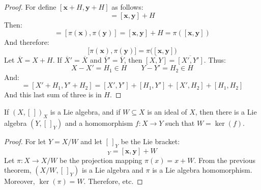 \documentclass[crop=false,class=article]{standalone}                           %
\begin{document}
        \begin{proof}
            For define $[\mathbf{x}+H,\mathbf{y}+H]$ as follows:
            \begin{equation}
                [\mathbf{x}+H,\mathbf{y}+H]=[\mathbf{x},\mathbf{y}]+H
            \end{equation}
            Then:
            \begin{equation}
                [\mathbf{x}+H,\mathbf{y}+H]
                =[\pi(\mathbf{x}),\pi(\mathbf{y})]
                =[\mathbf{x},\mathbf{y}]+H
                =\pi([\mathbf{x},\mathbf{y}])
            \end{equation}
            And therefore:
            \begin{equation}
                \big[\pi(\mathbf{x}),\pi(\mathbf{y})\big]
                =\pi\big([\mathbf{x},\mathbf{y}]\big)
            \end{equation}
            Let $\overline{X}=X+H$. If $\overline{X}'=\overline{X}$ and
            $\overline{Y}'=\overline{Y}$, then
            $\overline{[X,Y]}=\overline{[X',Y']}$. Thus:
            \begin{equation}
                X-X'=H_{1}\in{H}\quad\quad
                Y-Y'=H_{2}\in{H}
            \end{equation}
            And:
            \begin{equation}
                [X,Y]=[X'+H_{1},Y'+H_{2}]
                =[X',Y']+[H_{1},Y']+[X',H_{2}]+[H_{1},H_{2}]
            \end{equation}
            And this last sum of three is in $H$.
        \end{proof}
        \begin{theorem}
            If $(X,[\,])_{X}$ is a Lie algebra, and if $W\subseteq{X}$ is an
            ideal of $X$, then there is a Lie algebra $(Y,[\,]_{Y})$ and a
            homomorphism $f:X\rightarrow{Y}$ such that $W=\ker(f)$.
        \end{theorem}
        \begin{proof}
            For let $Y=X/W$ and let $[\,]_{Y}$ be the Lie bracket:
            \begin{equation}
                [\mathbf{x}+W,\mathbf{y}+W]_{Y}=[\mathbf{x},\mathbf{y}]+W
            \end{equation}
            Let $\pi:X\rightarrow{X/W}$ be the projection mapping
            $\pi(x)=x+W$. From the previous theorem,
            $(X/W,[\,]_{Y})$ is a Lie algebra and $\pi$ is a Lie algebra
            homomorphism. Moreover, $\ker(\pi)=W$. Therefore, etc.
        \end{proof}
\end{document}
